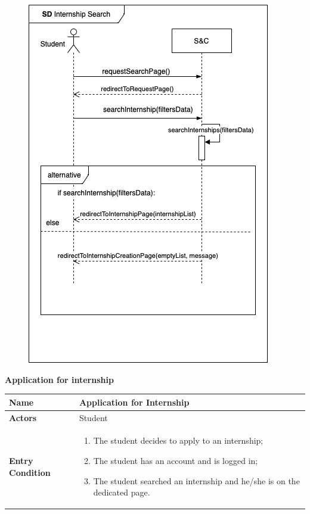 \begin{enumerate}[label=\textbf{[US\arabic*]}, left = 0pt, align = left, resume]
                
\newpage
            \begin{figure}[h!]
                \centering  \includegraphics[]{RASD/Images/UseCases/InternshipSearch.drawio.png}
                \label{fig:CompleteStudentProfile}
                \end{figure}
\newpage

            \newpage
            \item \textbf{Application for internship}
            
            \begin{longtable}{|l|p{11cm}|}  
                \hline
                \textbf{Name} & 
                    \textbf{Application for Internship} \\
                \hline
                
                \textbf{Actors} & 
                    Student \\
                \hline
                
                \textbf{Entry Condition} & 
                    \begin{enumerate}[label=\textbullet, itemsep=0em]
                        \item The student decides to apply to an internship;
                        \item The student has an account and is logged in;
                        \item The student searched an internship and he/she is on the dedicated page.
                    \end{enumerate} \\
                \hline
                

\end{longtable}
\end{enumerate}

